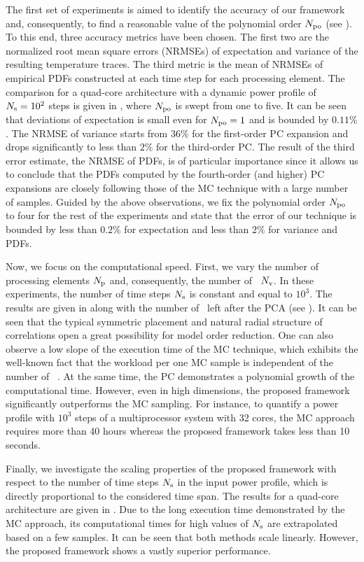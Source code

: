 
The first set of experiments is aimed to identify the accuracy of our framework and, consequently, to find a reasonable value of the polynomial order ${N_\text{po}}$ (see ). To this end, three accuracy metrics have been chosen. The first two are the normalized root mean square errors (NRMSEs) of expectation and variance of the resulting temperature traces. The third metric is the mean of NRMSEs of empirical PDFs constructed at each time step for each processing element. The comparison for a quad-core architecture with a dynamic power profile of $N_\text{s} = 10^2$ steps is given in , where ${N_\text{po}}$ is swept from one to five. It can be seen that deviations of expectation is small even for ${N_\text{po}} = 1$ and is bounded by $0.11\%$. The NRMSE of variance starts from $36\%$ for the first-order PC expansion and drops significantly to less than $2\%$ for the third-order PC. The result of the third error estimate, the NRMSE of PDFs, is of particular importance since it allows us to conclude that the PDFs computed by the fourth-order (and higher) PC expansions are closely following those of the MC technique with a large number of samples. Guided by the above observations, we fix the polynomial order ${N_\text{po}}$ to four for the rest of the experiments and state that the error of our technique is bounded by less than $0.2\%$ for expectation and less than $2\%$ for variance and PDFs.


Now, we focus on the computational speed. First, we vary the number of processing elements ${N_\text{p}}$ and, consequently, the number of \rvs\ ${N_\text{v}}$. In these experiments, the number of time steps $N_\text{s}$ is constant and equal to $10^3$. The results are given in  along with the number of \rvs\ left after the PCA (see ). It can be seen that the typical symmetric placement and natural radial structure of correlations \cite{cheng2011} open a great possibility for model order reduction. One can also observe a low slope of the execution time of the MC technique, which exhibits the well-known fact that the workload per one MC sample is independent of the number of \rvs\  \cite{maitre2010}. At the same time, the PC demonstrates a polynomial growth \cite{heiss2008} of the computational time. However, even in high dimensions, the proposed framework significantly outperforms the MC sampling. For instance, to quantify a power profile with $10^3$ steps of a multiprocessor system with 32 cores, the MC approach requires more than 40 hours whereas the proposed framework takes less than 10 seconds.

Finally, we investigate the scaling properties of the proposed framework with respect to the number of time steps $N_\text{s}$ in the input power profile, which is directly proportional to the considered time span. The results for a quad-core architecture are given in . Due to the long execution time demonstrated by the MC approach, its computational times for high values of $N_\text{s}$ are extrapolated based on a few samples. It can be seen that both methods scale linearly. However, the proposed framework shows a vastly superior performance.
